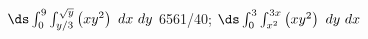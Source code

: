 {$\ds \int_{0}^{9}\int_{y/3}^{\sqrt{y}}\left(xy^2\right)\ dx\ dy$
}
{6561/40; $\ds \int_{0}^{3}\int_{x^2}^{3x}\left(xy^2\right)\ dy\ dx$
}